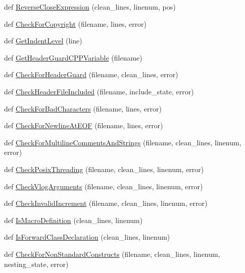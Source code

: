 \begin{DoxyCompactItemize}
def \hyperlink{namespacecpplint_a15cd96cbf1c13e655e156fbd98cf0bae}{Reverse\+Close\+Expression} (clean\+\_\+lines, linenum, pos)
\item 
def \hyperlink{namespacecpplint_a0ad6bf921300c829db3696b81fa52d20}{Check\+For\+Copyright} (filename, lines, error)
\item 
def \hyperlink{namespacecpplint_a1b5cb7c1367845d7c7079eac5ea61dc8}{Get\+Indent\+Level} (line)
\item 
def \hyperlink{namespacecpplint_a3f143d4e8f70c0fd05e3f0ce81b0cc9a}{Get\+Header\+Guard\+C\+P\+P\+Variable} (filename)
\item 
def \hyperlink{namespacecpplint_a3694fa1b195f49a0d78dfc81ee665eec}{Check\+For\+Header\+Guard} (filename, clean\+\_\+lines, error)
\item 
def \hyperlink{namespacecpplint_ab549dcced7ca1d4b24538ec52b42439e}{Check\+Header\+File\+Included} (filename, include\+\_\+state, error)
\item 
def \hyperlink{namespacecpplint_a03c0e0d285b02b0e26ec514761654da8}{Check\+For\+Bad\+Characters} (filename, lines, error)
\item 
def \hyperlink{namespacecpplint_a7a594af230939932174dd5743088027d}{Check\+For\+Newline\+At\+E\+OF} (filename, lines, error)
\item 
def \hyperlink{namespacecpplint_a81c4baf76bde576f56661c22d01e470d}{Check\+For\+Multiline\+Comments\+And\+Strings} (filename, clean\+\_\+lines, linenum, error)
\item 
def \hyperlink{namespacecpplint_a9c406c00843a2c47058b1e9dec4e5b11}{Check\+Posix\+Threading} (filename, clean\+\_\+lines, linenum, error)
\item 
def \hyperlink{namespacecpplint_ab066834feaa7bf5a92982bbfb0af89c1}{Check\+Vlog\+Arguments} (filename, clean\+\_\+lines, linenum, error)
\item 
def \hyperlink{namespacecpplint_a8b47da46bc61f72ab12e9228acc3a0cd}{Check\+Invalid\+Increment} (filename, clean\+\_\+lines, linenum, error)
\item 
def \hyperlink{namespacecpplint_a5a95ee1e23638e172a3361723503329c}{Is\+Macro\+Definition} (clean\+\_\+lines, linenum)
\item 
def \hyperlink{namespacecpplint_adde7d60b6354b40d9ef9acda6e847d7b}{Is\+Forward\+Class\+Declaration} (clean\+\_\+lines, linenum)
\item 
def \hyperlink{namespacecpplint_a954b179c4037e5da8ac599cce095c37e}{Check\+For\+Non\+Standard\+Constructs} (filename, clean\+\_\+lines, linenum, nesting\+\_\+state, error)

\end{DoxyCompactItemize}
